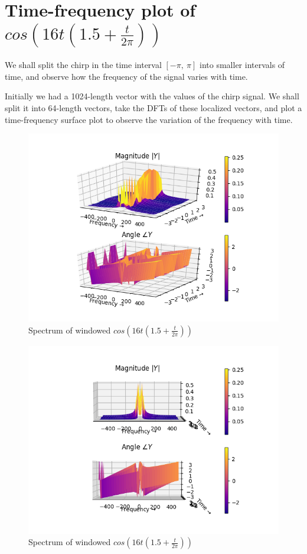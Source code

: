 \documentclass[11pt, a4paper, twoside]{article}
\begin{document}
\section{Time-frequency plot of $cos(16t(1.5 + \frac{t}{2\pi}))$}
    We shall split the chirp in the time interval $[-\pi,\ \pi]$ into smaller intervals of time, and observe how the frequency of the signal varies with time.
    
    Initially we had a 1024-length vector with the values of the chirp signal. We shall split it into 64-length vectors, take the DFTs of these localized vectors, and plot a time-frequency surface plot to observe the variation of the frequency with time.
    
    \begin{figure}[H]
        \centering
        \includegraphics[scale=0.5]{Fig10.png}
        \caption{Spectrum of windowed $cos(16t(1.5 + \frac{t}{2\pi}))$}
        \label{fig:Fig6}
    \end{figure}
    \begin{figure}[H]
        \centering
        \includegraphics[scale=0.5]{Figure_10.png}
        \caption{Spectrum of windowed $cos(16t(1.5 + \frac{t}{2\pi}))$}
        \label{fig:Fig6}
    \end{figure}
    
\end{document}
